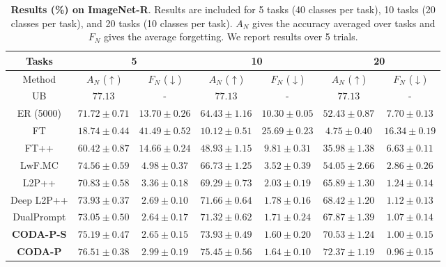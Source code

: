 \begin{table}[t]
\caption{\textbf{Results (\%) on ImageNet-R}. Results are included for 5 tasks (40 classes per task), 10 tasks (20 classes per task), and 20 tasks (10 classes per task). $A_N$ gives the accuracy averaged over tasks and $F_N$ gives the average forgetting. We report results over 5 trials. %
}
\label{tab:imnet-r_main}
\centering

\begin{tabular}{c||c c||c c||c c} 
\hline 
Tasks & \multicolumn{2}{c||}{5} & \multicolumn{2}{c||}{10} & \multicolumn{2}{c}{20} \\
\hline
\rule{0pt}{10pt} Method & $A_N$ ($\uparrow$) & $F_N$ ($\downarrow$) & $A_N$ ($\uparrow$) & $F_N$ ($\downarrow$) & $A_N$ ($\uparrow$) & $F_N$ ($\downarrow$) \\
\hline
UB  
& $77.13$ & - 
& $77.13$ & - 
& $77.13$ & -   \\ 
\hline
ER (5000)        
& $71.72 \pm 0.71$ & $13.70 \pm 0.26$ 
& $64.43 \pm 1.16$ & $10.30 \pm 0.05$
& $52.43 \pm 0.87$ & $7.70 \pm 0.13$  \\  
FT          
& $18.74 \pm 0.44$ & $41.49 \pm 0.52$
& $10.12 \pm 0.51$ & $25.69 \pm 0.23$
& $4.75 \pm 0.40$ & $16.34 \pm 0.19$  \\
FT++          
& $60.42 \pm 0.87$ & $14.66 \pm 0.24$
& $48.93 \pm 1.15$ & $9.81 \pm 0.31$
& $35.98 \pm 1.38$ & $6.63 \pm 0.11$  \\
LwF.MC       
& $74.56 \pm 0.59$ & $4.98 \pm 0.37$ 
& $66.73 \pm 1.25$ & $3.52 \pm 0.39$
& $54.05 \pm 2.66$ & $2.86 \pm 0.26$  \\
L2P++        
& $70.83 \pm 0.58$ & $3.36 \pm 0.18$
& $69.29 \pm 0.73$ & $2.03 \pm 0.19$ 
& $65.89 \pm 1.30$ & $1.24 \pm 0.14$   \\
Deep L2P++  
& $73.93 \pm 0.37$ & $2.69 \pm 0.10$
& $71.66 \pm 0.64$ & $1.78 \pm 0.16$ 
& $68.42 \pm 1.20$ & $1.12 \pm 0.13$  \\
DualPrompt 
& $73.05 \pm 0.50$ & $\bm{2.64 \pm 0.17}$
& $71.32 \pm 0.62$ & $1.71 \pm 0.24$ 
& $67.87 \pm 1.39$ & $1.07 \pm 0.14$   \\
\hdashline
\textbf{CODA-P-S} 
& $75.19 \pm 0.47$ & $2.65 \pm 0.15$
& $73.93 \pm 0.49$ & $1.60 \pm 0.20$
& $70.53 \pm 1.24$ & $1.00 \pm 0.15$  \\
\textbf{CODA-P}   
& $\bm{76.51 \pm 0.38}$ & $2.99 \pm 0.19$
& $\bm{75.45 \pm 0.56}$ & $\bm{1.64 \pm 0.10}$
& $\bm{72.37 \pm 1.19}$ & $\bm{0.96 \pm 0.15}$  \\ 

\hline
\end{tabular}
\end{table}




